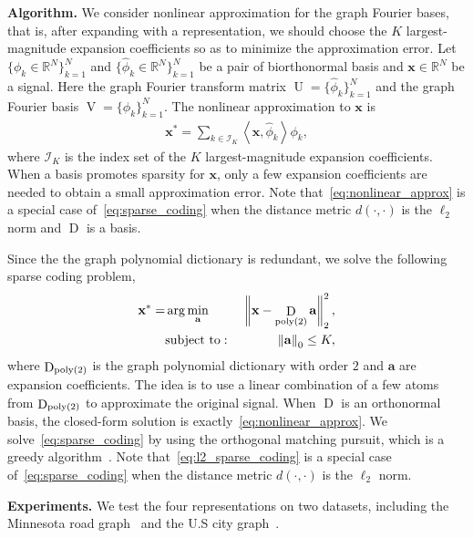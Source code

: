 \documentclass[journal,twocolumn,10pt]{IEEEtran}
\theoremstyle{definition}
\newcommand{\mypar}[1]{{\bf #1.}}
\newcommand{\R}{\ensuremath{\mathbb{R}}}
\def\a{\mathbf{a}}
\def\x{\mathbf{x}}
\DeclareMathOperator{\D}{D}
\DeclareMathOperator{\Vm}{V}
\DeclareMathOperator{\Um}{U}
\begin{document}
\mypar{Algorithm}
We consider nonlinear approximation for the graph Fourier bases, that is, after expanding with a representation, we should choose the $K$ largest-magnitude expansion coefficients so as to minimize the approximation error. Let $\{ \phi_k \in \R^N \}_{k=1}^N$ and  $\{ \widehat{\phi}_k \in \R^N \}_{k=1}^N$ be a pair of biorthonormal basis and $\x \in  \R^N $ be a signal. Here the graph Fourier transform matrix $\Um = \{ \widehat{\phi}_k \}_{k=1}^N$ and the graph Fourier basis $\Vm = \{ \phi_k \}_{k=1}^N$. The nonlinear approximation to $\x$ is 
\begin{eqnarray}
\label{eq:nonlinear_approx}
   \x^* = \sum_{k \in \mathcal{I}_K} \left\langle {\x, \widehat{\phi}_k} \right\rangle \phi_k,
\end{eqnarray}
where $\mathcal{I}_K$ is the index set of the $K$ largest-magnitude expansion coefficients. When a basis promotes sparsity for $\x$, only a few expansion coefficients are needed to obtain a small approximation error. Note that~\eqref{eq:nonlinear_approx} is a special case of~\eqref{eq:sparse_coding} when the distance metric $d(\cdot, \cdot)$ is the $\ell_2$ norm and $\D$ is a basis.

Since the the graph polynomial dictionary is redundant, we solve the following sparse coding problem,
\begin{eqnarray}
\label{eq:l2_sparse_coding}
   \x^* =  &  \arg \min_{\a} & \left\| \x - \D_{\rm poly(2)} \a  \right\|_2^2,
   \\
   \nonumber
   & {\rm subject~to:~} &  \left\| \a \right\|_0 \leq K,
\end{eqnarray}
where $\D_{\rm poly(2)}$ is the graph polynomial dictionary with order $2$ and $\a$ are expansion coefficients. The idea is to use a linear combination of a few atoms from $\D_{\rm poly(2)}$ to approximate the original signal. When $\D$ is an orthonormal basis, the closed-form solution is exactly~\eqref{eq:nonlinear_approx}. We solve~\eqref{eq:sparse_coding} by using the orthogonal matching pursuit, which is a greedy algorithm~\cite{PatiRK:93}. Note that~\eqref{eq:l2_sparse_coding} is a special case of~\eqref{eq:sparse_coding} when the distance metric $d(\cdot, \cdot)$ is the $\ell_2$ norm.







\mypar{Experiments}
We test the four representations on two datasets, including the Minnesota road graph~\cite{MinnesotaGraph} and the U.S city graph~\cite{ChenSMK:14}.
\end{document}
